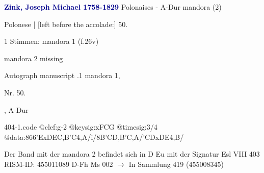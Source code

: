 \documentclass[twocolumn]{book}
\begin{document}
\newline \par \vspace{7pt} \textcolor{darkblue}{\textbf{Zink, Joseph Michael  1758-1829}}
\newline Polonaises - A-Dur
\newline mandora (2)
\newline \begin{itshape}[f.26v, at left:] Polonese | [left before the accolade:] 50.\end{itshape} 
\newline \textcolor{darkblue}{}  1 Stimmen: mandora 1  (f.26v)
\newline \begin{small} mandora 2 missing\end{small} 
\newline Autograph manuscript
.1  mandora 1, \begin{itshape}Nr. 50.\end{itshape}, A-Dur  
\begin{filecontents*}{404-1.code}
@clef:g-2
@keysig:xFCG
@timesig:3/4
@data:{866'ExDE}{C,B'C}4,A/i/8{B'C}{D,B}{'C,A}/{'CD}{xDE}4,B/
\end{filecontents*}
\newline
%
\newline Der Band mit der mandora 2 befindet sich in D Eu mit der Signatur Esl VIII 403
\newline RISM-ID: 455011089
\newline D-Fh  Ms 002
\newline $\rightarrow$ In Sammlung 419 (455008345)
      
\end{document}
